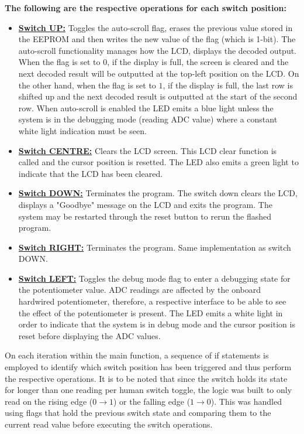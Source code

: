 \documentclass{cce2014-design}
\begin{document}
\vspace{1em}
\textbf{The following are the respective operations for each switch position:}

\begin{itemize}
   \item[{}] \textbf{\underline{Switch UP:}} Toggles the auto-scroll flag, erases the previous value stored in the EEPROM and then writes the new value of the flag (which is 1-bit). The auto-scroll functionality manages how the LCD, displays the decoded output. When the flag is set to $0$, if the display is full, the screen is cleared and the next decoded result will be outputted at the top-left position on the LCD. On the other hand, when the flag is set to $1$, if the display is full, the last row is shifted up and the next decoded result is outputted at the start of the second row. When auto-scroll is enabled the LED emits a blue light unless the system is in the debugging mode (reading ADC value) where a constant white light indication must be seen.
      \vspace{0.5em}
   \item[{}] \textbf{\underline{Switch CENTRE:}} Clears the LCD screen. This LCD clear function is called and the cursor position is resetted. The LED also emits a green light to indicate that the LCD has been cleared.
      \vspace{0.5em}
   \item[{}] \textbf{\underline{Switch DOWN:}} Terminates the program. The switch down clears the LCD, displays a "Goodbye" message on the LCD and exits the program. The system may be restarted through the reset button to rerun the flashed program.
      \vspace{0.5em}
   \item[{}] \textbf{\underline{Switch RIGHT:}} Terminates the program. Same implementation as switch DOWN.
      \vspace{0.5em}
   \item[{}] \textbf{\underline{Switch LEFT:}} Toggles the debug mode flag to enter a debugging state for the potentiometer value. ADC readings are affected by the onboard hardwired potentiometer, therefore, a respective interface to be able to see the effect of the potentiometer is present. The LED emits a white light in order to indicate that the system is in debug mode and the cursor position is reset before displaying the ADC values.
\end{itemize}

On each iteration within the main function, a sequence of if statements is employed to identify which switch position has been triggered and thus perform the respective operations.
It is to be noted that since the switch holds its state for longer than one reading per human switch toggle, the logic was built to only read on the rising edge ($0 \rightarrow 1$) or the falling edge ($1 \rightarrow 0$).
This was handled using flags that hold the previous switch state and comparing them to the current read value before executing the switch operations.
\end{document}

